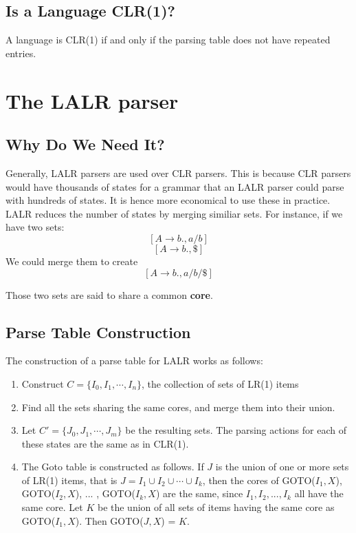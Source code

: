 \documentclass[12pt,letterpaper]{amsbook}
\theoremstyle{definition}
\begin{document}
\subsection{Is a Language CLR(1)?}

A language is CLR(1) if and only if the parsing table does not have repeated entries.

\section{The LALR parser}

\subsection{Why Do We Need It?}

Generally, LALR parsers are used over CLR parsers. This is because CLR parsers would have thousands of states for a grammar that an LALR parser could parse with hundreds of states. It is hence more economical to use these in practice. LALR reduces the number of states by merging similiar sets. For instance, if we have two sets:
\[[A \rightarrow b ., a/b]\]
\[[A \rightarrow b ., \$]\]
We could merge them to create
\[[A \rightarrow b . , a/b/\$]\]

Those two sets are said to share a common \textbf{core}.

\subsection{Parse Table Construction}

The construction of a parse table for LALR works as follows:

\begin{enumerate}
  \item Construct $C = \{I_0,I_1,\cdots,I_n\}$, the collection of sets of LR(1) items
  \item Find all the sets sharing the same cores, and merge them into their union.
  \item Let $C' = \{J_0,J_1,\cdots,J_m\}$ be the resulting sets. The parsing actions for each of these states are the same as in CLR(1).
  \item The Goto table is constructed as follows. If $J$ is the union of one or more sets of LR(1) items, that is $J = I_1 \cup I_2 \cup \cdots \cup I_k$, then the cores of GOTO($I_1,X$), GOTO($I_2,X$), ... , GOTO($I_k,X$) are the same, since $I_1,I_2,...,I_k$ all have the same core. Let $K$ be the union of all sets of items having the same core as GOTO($I_1,X$). Then GOTO($J,X$) = $K$.
\end{enumerate}
\end{document}
